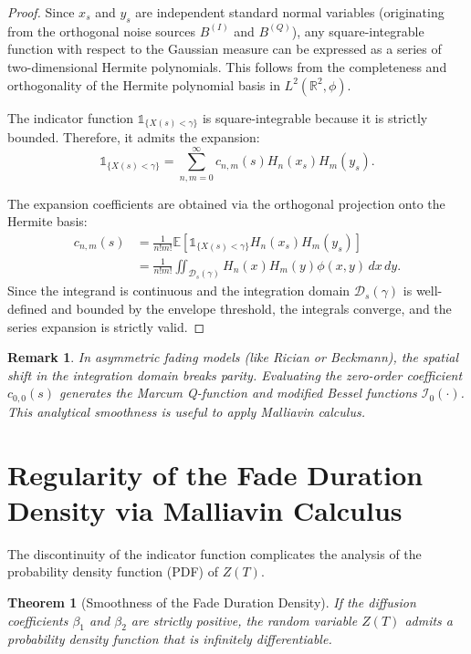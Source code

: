 \documentclass[11pt]{article}
\newtheorem{remark}{Remark}
\newtheorem{theorem}{Theorem}
\begin{document}
\begin{proof}
Since $x_s$ and $y_s$ are independent standard normal variables (originating from the orthogonal noise sources $B^{(I)}$ and $B^{(Q)}$), any square-integrable function with respect to the Gaussian measure can be expressed as a series of two-dimensional Hermite polynomials. This follows from the completeness and orthogonality of the Hermite polynomial basis in $L^2(\mathbb{R}^2, \phi)$.

The indicator function $\mathds{1}_{\{X(s) < \gamma\}}$ is square-integrable because it is strictly bounded. Therefore, it admits the expansion:
\begin{equation}
    \mathds{1}_{\{X(s) < \gamma\}} = \sum_{n,m=0}^\infty c_{n,m}(s) H_n(x_s) H_m(y_s).
\end{equation}

The expansion coefficients are obtained via the orthogonal projection onto the Hermite basis:
\begin{align}
  c_{n,m}(s) &= \frac{1}{n! m!} \mathbb{E}\left[\mathds{1}_{\{X(s) < \gamma\}} H_n(x_s) H_m(y_s)\right] \nonumber\\
  &= \frac{1}{n! m!} \iint_{\mathcal{D}_s(\gamma)} H_n(x) H_m(y) \phi(x,y) \, dx \, dy.
\end{align}
Since the integrand is continuous and the integration domain $\mathcal{D}_s(\gamma)$ is well-defined and bounded by the envelope threshold, the integrals converge, and the series expansion is strictly valid.
\end{proof}

\begin{remark}
In asymmetric fading models (like Rician or Beckmann), the spatial shift in the integration domain breaks parity. Evaluating the zero-order coefficient $c_{0,0}(s)$ generates the Marcum Q-function and modified Bessel functions $\mathcal{I}_0(\cdot)$. This analytical smoothness is useful to apply Malliavin calculus.
\end{remark}

\section{Regularity of the Fade Duration Density via Malliavin Calculus} \label{sec:malliavin_sensitivity} 

The discontinuity of the indicator function complicates the analysis of the probability density function (PDF) of $Z(T)$. 

\begin{theorem}[Smoothness of the Fade Duration Density]\label{th:smooth}
If the diffusion coefficients $\beta_1$ and $\beta_2$ are strictly positive, the random variable $Z(T)$ admits a probability density function that is infinitely differentiable.
\end{theorem}
\end{document}
